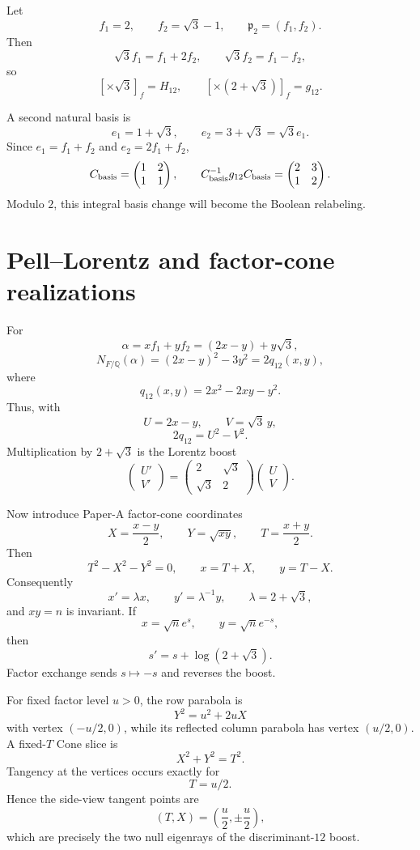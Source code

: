\documentclass[11pt]{article}
\theoremstyle{remark}
\newcommand{\Q}{\mathbb Q}
\begin{document}
Let
\[
f_1=2,
\qquad f_2=\sqrt3-1,
\qquad \mathfrak p_2=(f_1,f_2).
\]
Then
\[
\sqrt3 f_1=f_1+2f_2,
\qquad
\sqrt3 f_2=f_1-f_2,
\]
so
\[
[\times\sqrt3]_f=H_{12},
\qquad
[\times(2+\sqrt3)]_f=g_{12}.
\]

A second natural basis is
\[
e_1=1+\sqrt3,
\qquad e_2=3+\sqrt3=\sqrt3 e_1.
\]
Since $e_1=f_1+f_2$ and $e_2=2f_1+f_2$,
\[
C_{\rm basis}=\begin{pmatrix}1&2\\1&1\end{pmatrix},
\qquad
C_{\rm basis}^{-1}g_{12}C_{\rm basis}
=\begin{pmatrix}2&3\\1&2\end{pmatrix}.
\]
Modulo $2$, this integral basis change will become the Boolean relabeling.

\section{Pell--Lorentz and factor-cone realizations}

For
\[
\alpha=xf_1+yf_2=(2x-y)+y\sqrt3,
\]
\[
N_{F/\Q}(\alpha)
=(2x-y)^2-3y^2
=2q_{12}(x,y),
\]
where
\[
q_{12}(x,y)=2x^2-2xy-y^2.
\]
Thus, with
\[
U=2x-y,
\qquad V=\sqrt3\,y,
\]
\[
2q_{12}=U^2-V^2.
\]
Multiplication by $2+\sqrt3$ is the Lorentz boost
\[
\begin{pmatrix}U'\\V'\end{pmatrix}
=
\begin{pmatrix}2&\sqrt3\\\sqrt3&2\end{pmatrix}
\begin{pmatrix}U\\V\end{pmatrix}.
\]

Now introduce Paper-A factor-cone coordinates
\[
X=\frac{x-y}{2},
\qquad Y=\sqrt{xy},
\qquad T=\frac{x+y}{2}.
\]
Then
\[
T^2-X^2-Y^2=0,
\qquad x=T+X,
\qquad y=T-X.
\]
Consequently
\[
\boxed{x'=\lambda x,\qquad y'=\lambda^{-1}y,}
\qquad \lambda=2+\sqrt3,
\]
and $xy=n$ is invariant.  If
\[
x=\sqrt n e^s,
\qquad y=\sqrt n e^{-s},
\]
then
\[
\boxed{s'=s+\log(2+\sqrt3).}
\]
Factor exchange sends $s\mapsto-s$ and reverses the boost.

For fixed factor level $u>0$, the row parabola is
\[
Y^2=u^2+2uX
\]
with vertex $(-u/2,0)$, while its reflected column parabola has vertex
$(u/2,0)$.  A fixed-$T$ Cone slice is
\[
X^2+Y^2=T^2.
\]
Tangency at the vertices occurs exactly for
\[
T=u/2.
\]
Hence the side-view tangent points are
\[
(T,X)=\left(\frac u2,\pm\frac u2\right),
\]
which are precisely the two null eigenrays of the discriminant-$12$ boost.
\end{document}
